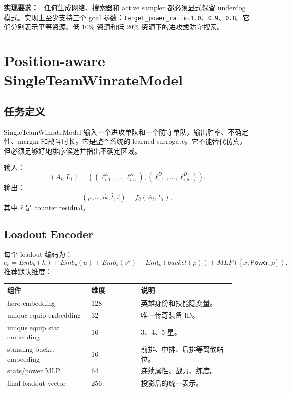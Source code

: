 \documentclass[UTF8,12pt,openany]{ctexbook}
\newcommand{\Power}{\mathsf{Power}}
\newenvironment{implbox}{\begin{framed}\noindent\textbf{实现要求：}\ }{\end{framed}}
\begin{document}
\begin{implbox}
任何生成网络、搜索器和 active sampler 都必须显式保留 underdog 模式。实现上至少支持三个 goal 参数：\texttt{target\_power\_ratio=1.0}、\texttt{0.9}、\texttt{0.8}。它们分别表示平等资源、低 10\% 资源和低 20\% 资源下的进攻或防守搜索。
\end{implbox}


\chapter{Position-aware SingleTeamWinrateModel}

\section{任务定义}
SingleTeamWinrateModel 输入一个进攻单队和一个防守单队，输出胜率、不确定性、margin 和战斗时长。它是整个系统的 learned surrogate。它不能替代仿真，但必须足够好地排序候选并指出不确定区域。

输入：
\begin{equation}
(A_i,L_i)=((\ell^A_{i,1},\ldots,\ell^A_{i,5}),(\ell^D_{i,1},\ldots,\ell^D_{i,5})).
\end{equation}
输出：
\begin{equation}
(\mu,\sigma,\hat m,\hat t,\hat r)=f_\theta(A_i,L_i),
\end{equation}
其中 $\hat r$ 是 counter residual。

\section{Loadout Encoder}
每个 loadout 编码为：
\begin{equation}
e_\ell=Emb_h(h)+Emb_u(u)+Emb_s(s^u)+Emb_b(bucket(\rho))+MLP([x,\Power,\rho]).
\end{equation}
推荐默认维度：
\begin{longtable}{p{0.34\linewidth}p{0.20\linewidth}p{0.38\linewidth}}
\toprule
组件 & 维度 & 说明 \\
\midrule
hero embedding & 128 & 英雄身份和技能隐变量。\\
unique equip embedding & 32 & 唯一传奇装备 ID。\\
unique equip star embedding & 16 & 3、4、5 星。\\
standing bucket embedding & 16 & 前排、中排、后排等离散站位。\\
stats/power MLP & 64 & 连续属性、战力、练度。\\
final loadout vector & 256 & 投影后的统一表示。\\
\bottomrule
\end{longtable}
\end{document}
